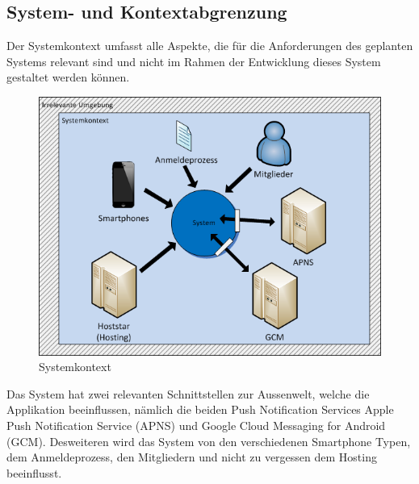 \subsection{System- und Kontextabgrenzung}\label{systemabgrenzung}
Der Systemkontext umfasst alle Aspekte, die für die Anforderungen des geplanten Systems relevant sind und nicht im Rahmen der Entwicklung dieses System gestaltet werden können.\cite{req_eng_book} 
\begin{figure}[h]
\includegraphics{images/visio/systemkontext.png}
\caption{Systemkontext}
\label{fig:systemkontext}
\end{figure}

Das System hat zwei relevanten Schnittstellen zur Aussenwelt, welche die Applikation beeinflussen, nämlich die beiden Push Notification Services Apple Push Notification Service (APNS) und Google Cloud Messaging for Android (GCM). Desweiteren wird das System von den verschiedenen Smartphone Typen, dem Anmeldeprozess, den Mitgliedern und nicht zu vergessen dem Hosting beeinflusst.

